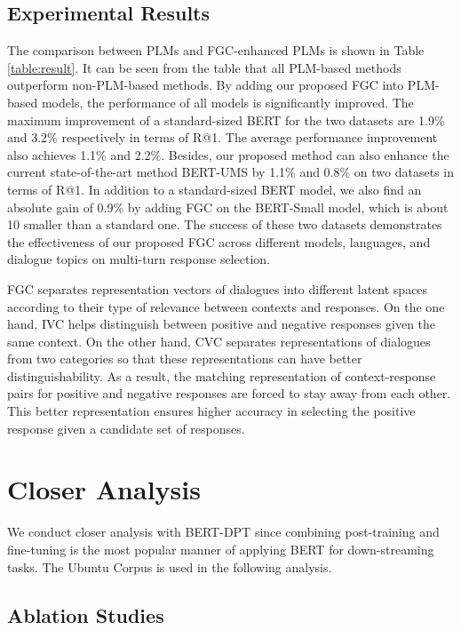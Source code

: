 \documentclass[letterpaper]{article} \usepackage{aaai22}  \usepackage{times}  \usepackage{helvet}  \usepackage{courier}  \usepackage[hyphens]{url}  \usepackage{graphicx} \urlstyle{rm} \def\UrlFont{\rm}  \usepackage{natbib}  \usepackage{caption} \DeclareCaptionStyle{ruled}{labelfont=normalfont,labelsep=colon,strut=off} \frenchspacing  \setlength{\pdfpagewidth}{8.5in}  \setlength{\pdfpageheight}{11in}  \usepackage{algorithm}
\begin{document}
\subsection{Experimental Results}

The comparison between PLMs and FGC-enhanced PLMs is shown in Table \ref{table:result}. It can be seen from the table that all PLM-based methods outperform non-PLM-based methods. By adding our proposed FGC into PLM-based models, the performance of all models is significantly improved. The maximum improvement of a standard-sized BERT for the two datasets are 1.9\% and 3.2\% respectively in terms of R@1. The average performance improvement also achieves 1.1\% and 2.2\%. Besides, our proposed method can also enhance the current state-of-the-art method BERT-UMS by 1.1\% and 0.8\% on two datasets in terms of R@1. In addition to a standard-sized BERT model, we also find an absolute gain of 0.9\% by adding FGC on the BERT-Small model, which is about 10 smaller than a standard one. The success of these two datasets demonstrates the effectiveness of our proposed FGC across different models, languages, and dialogue topics on multi-turn response selection. 

FGC separates representation vectors of dialogues into different latent spaces according to their type of relevance between contexts and responses. On the one hand, IVC helps distinguish between positive and negative responses given the same context. On the other hand, CVC separates representations of dialogues from two categories so that these representations can have better distinguishability. As a result, the matching representation of context-response pairs for positive and negative responses are forced to stay away from each other. This better representation ensures higher accuracy in selecting the positive response given a candidate set of responses. 


\section{Closer Analysis}

We conduct closer analysis with BERT-DPT since combining post-training and fine-tuning is the most popular manner of applying BERT for down-streaming tasks. The Ubuntu Corpus is used in the following analysis.

\subsection{Ablation Studies}
\end{document}
